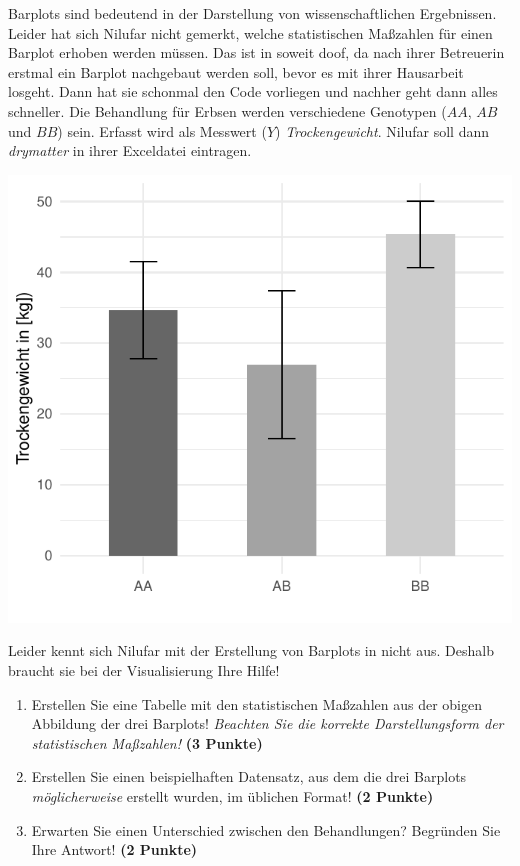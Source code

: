 \documentclass[a4paper, 9pt]{scrartcl}\usepackage[]{graphicx}\usepackage[]{xcolor}
\makeatletter
\def\maxwidth{ %
  \ifdim\Gin@nat@width>\linewidth
    \linewidth
  \else
    \Gin@nat@width
  \fi
}
\makeatother
\begin{document}
Barplots sind bedeutend in der Darstellung von wissenschaftlichen Ergebnissen. Leider hat sich Nilufar nicht gemerkt, welche statistischen Maßzahlen für einen Barplot erhoben werden müssen. Das ist in soweit doof, da nach ihrer Betreuerin erstmal ein Barplot nachgebaut werden soll, bevor es mit ihrer Hausarbeit losgeht. Dann hat sie schonmal den \Rlogo Code vorliegen und nachher geht dann alles schneller. Die Behandlung für Erbsen werden verschiedene Genotypen ($AA$, $AB$ und $BB$) sein. Erfasst wird als Messwert ($Y$) \textit{Trockengewicht}. Nilufar soll dann \textit{drymatter} in ihrer Exceldatei eintragen.



{\centering \includegraphics[width=\maxwidth]{img/barplot-02-1} 

}




Leider kennt sich Nilufar mit der Erstellung von Barplots in \Rlogo nicht aus. Deshalb braucht sie bei der Visualisierung Ihre Hilfe!

\begin{enumerate}
\item Erstellen Sie eine Tabelle mit den statistischen Maßzahlen aus der
  obigen Abbildung der drei Barplots! \textit{Beachten Sie die korrekte
    Darstellungsform der statistischen Maßzahlen!} \textbf{(3 Punkte)}
\item Erstellen Sie einen beispielhaften Datensatz, aus dem die drei
  Barplots \textit{möglicherweise} erstellt wurden, im \Rlogo üblichen Format! \textbf{(2 Punkte)}
\item Erwarten Sie einen Unterschied zwischen den Behandlungen? Begründen
  Sie Ihre Antwort! \textbf{(2 Punkte)}
\end{enumerate} 
\clearpage
\end{document}
